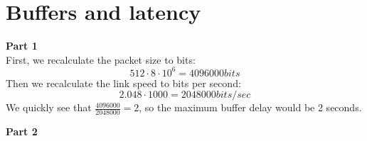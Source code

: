 \section{Buffers and latency}
\textbf{Part 1}\\
First, we recalculate the packet size to bits:
\[
512 \cdot 8 \cdot 10^6 = 4096000 bits
\]
Then we recalculate the link speed to bits per second:
\[
2.048 \cdot 1000 = 2048000 bits/sec
\]
We quickly see that $\frac{4096000}{2048000} = 2$, so the maximum buffer delay
would be 2 seconds.

\noindent \textbf{Part 2}
